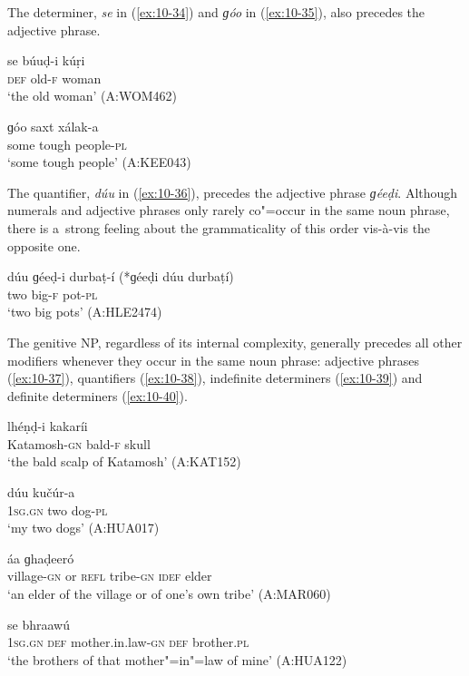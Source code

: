 The determiner, \textit{se} in (\ref{ex:10-34}) and \textit{ɡóo} in (\ref{ex:10-35}), also precedes the adjective phrase.

\begin{exe}
\ex
\label{ex:10-34}
\gll se búuḍ-i kúṛi \\
\textsc{def} old-\textsc{f} woman \\
\glt `the old woman' (A:WOM462)

\ex
\label{ex:10-35}
\gll ɡóo saxt xálak-a \\
some tough people-\textsc{pl}  \\
\glt `some tough people' (A:KEE043)
\end{exe}


The quantifier, \textit{dúu} in (\ref{ex:10-36}), precedes the adjective phrase \textit{ɡéeḍi}. Although numerals and adjective phrases only rarely co"=occur in the same noun phrase, there is a~strong feeling about the grammaticality of this order vis-à-vis the opposite one.

\begin{exe}
\ex
\label{ex:10-36}
\gll dúu ɡéeḍ-i durbaṭ-í (*ɡéeḍi dúu durbaṭí) \\
two big-\textsc{f} pot-\textsc{pl} \\
\glt `two big pots' (A:HLE2474)
\end{exe}


The genitive NP, regardless of its internal complexity, generally precedes all other modifiers
whenever they occur in the same noun phrase: adjective phrases (\ref{ex:10-37}), quantifiers
(\ref{ex:10-38}), indefinite determiners (\ref{ex:10-39}) and definite determiners
(\ref{ex:10-40}).

\begin{exe}
\ex
\label{ex:10-37}
\gll [kaṭamuš-íi] lhéṇḍ-i kakaríi \\
Katamosh-\textsc{gn} bald-\textsc{f} skull \\
\glt `the bald scalp of Katamosh' (A:KAT152)

\ex
\label{ex:10-38}
\gll [míi] dúu kučúr-a \\
\textsc{1sg.gn} two dog-\textsc{pl}  \\
\glt `my two dogs' (A:HUA017)

\ex
\label{ex:10-39}
 áa ɡhaḍeeró  \\
village-\textsc{gn} or \textsc{refl} tribe-\textsc{gn} \textsc{idef} elder \\
\glt `an elder of the village or of one's own tribe' (A:MAR060)

\ex
\label{ex:10-40}
 se bhraawú \\
\textsc{1sg.gn} \textsc{def} mother.in.law-\textsc{gn} \textsc{def} brother.\textsc{pl}  \\
\glt `the brothers of that mother"=in"=law of mine' (A:HUA122)
\end{exe}


